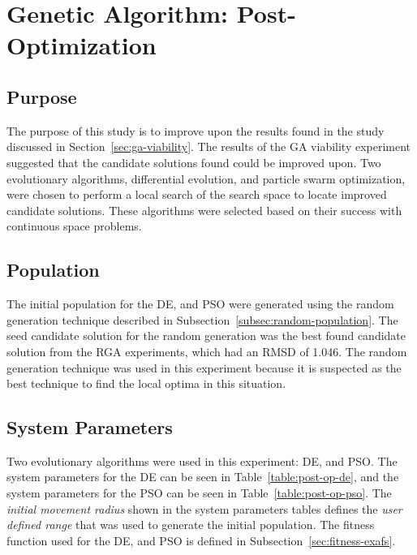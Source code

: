 \section{Genetic Algorithm: Post-Optimization}
\label{sec:ga-post-op}

\subsection{Purpose}

The purpose of this study is to improve upon the results found in the study discussed in Section~\ref{sec:ga-viability}. The results of the GA viability experiment suggested that the candidate solutions found could be improved upon. Two evolutionary algorithms, differential evolution, and particle swarm optimization, were chosen to perform a local search of the search space to locate improved candidate solutions. These algorithms were selected based on their success with continuous space problems.

\subsection{Population}

The initial population for the DE, and PSO were generated using the random generation technique described in Subsection~\ref{subsec:random-population}. The seed candidate solution for the random generation was the best found candidate solution from the RGA experiments, which had an RMSD of 1.046. The random generation technique was used in this experiment because it is suspected as the best technique to find the local optima in this situation.


\subsection{System Parameters}

Two evolutionary algorithms were used in this experiment: DE, and PSO. The system parameters for the DE can be seen in Table~\ref{table:post-op-de}, and the system parameters for the PSO can be seen in Table~\ref{table:post-op-pso}. The \textit{initial movement radius} shown in the system parameters tables defines the \textit{user defined range} that was used to generate the initial population. The fitness function used for the DE, and PSO is defined in Subsection~\ref{sec:fitness-exafs}.

